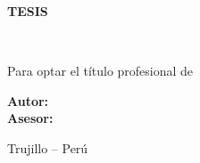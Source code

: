 \begin{titlepage} \centering\par {\LARGE \tesisUniversidad}\\[0.3cm]
{\large \tesisFacultad}\\[0.3cm] {\large \tesisCarrera}\\[3.5cm]\par {\LARGE
\textbf{TESIS}}\\[1.2cm]\par {\LARGE\bfseries \tesisTitulo}\\[2.5cm]\par {\large
Para optar el título profesional de \tesisTituloProfesional}\\[2.5cm]\par {\large\textbf{Autor:}
\tesisAutor}\\[0.3cm] {\large\textbf{Asesor:} \tesisAsesor}\\[3.5cm]\par {\large
Trujillo -- Perú}\\[0.3cm] {\large \tesisFecha}\par \end{titlepage}
